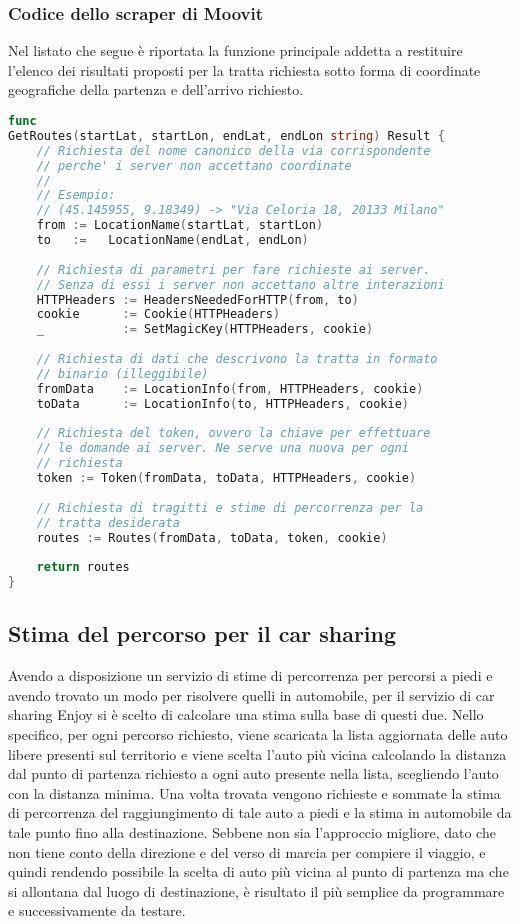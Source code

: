 \subsubsection{Codice dello scraper di Moovit}

Nel listato che segue è riportata la funzione principale addetta a restituire l'elenco dei risultati proposti per la tratta richiesta sotto forma di coordinate geografiche della partenza e dell'arrivo richiesto.

\begin{lstlisting}[language=Go]
func
GetRoutes(startLat, startLon, endLat, endLon string) Result {
	// Richiesta del nome canonico della via corrispondente
	// perche' i server non accettano coordinate
	//
	// Esempio:
	// (45.145955, 9.18349) -> "Via Celoria 18, 20133 Milano"
	from := LocationName(startLat, startLon)
	to   :=   LocationName(endLat, endLon)
	
	// Richiesta di parametri per fare richieste ai server.
	// Senza di essi i server non accettano altre interazioni
	HTTPHeaders := HeadersNeededForHTTP(from, to)
	cookie      := Cookie(HTTPHeaders)
	_           := SetMagicKey(HTTPHeaders, cookie)
	
	// Richiesta di dati che descrivono la tratta in formato
	// binario (illeggibile)
	fromData    := LocationInfo(from, HTTPHeaders, cookie)
	toData      := LocationInfo(to, HTTPHeaders, cookie)
	
	// Richiesta del token, ovvero la chiave per effettuare
	// le domande ai server. Ne serve una nuova per ogni
	// richiesta
	token := Token(fromData, toData, HTTPHeaders, cookie)
	
	// Richiesta di tragitti e stime di percorrenza per la
	// tratta desiderata
	routes := Routes(fromData, toData, token, cookie)
	
	return routes
}
\end{lstlisting}

\subsection{Stima del percorso per il car sharing}

Avendo a disposizione un servizio di stime di percorrenza per percorsi a piedi e avendo trovato un modo per risolvere quelli in automobile, per il servizio di car sharing Enjoy si è scelto di calcolare una stima sulla base di questi due. Nello specifico, per ogni percorso richiesto, viene scaricata la lista aggiornata delle auto libere presenti sul territorio e viene scelta l'auto più vicina calcolando la distanza dal punto di partenza richiesto a ogni auto presente nella lista, scegliendo l'auto con la distanza minima. Una volta trovata vengono richieste e sommate la stima di percorrenza del raggiungimento di tale auto a piedi e la stima in automobile da tale punto fino alla destinazione. Sebbene non sia l'approccio migliore, dato che non tiene conto della direzione e del verso di marcia per compiere il viaggio, e quindi rendendo possibile la scelta di auto più vicina al punto di partenza ma che si allontana dal luogo di destinazione, è risultato il più semplice da programmare e successivamente da testare.


